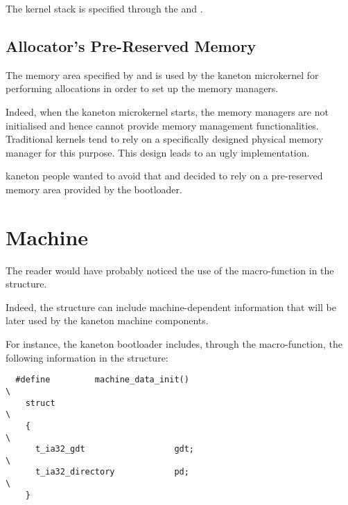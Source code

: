 The kernel stack is specified through the  and
.


\subsection*{Allocator's Pre-Reserved Memory}

The memory area specified by  and  is used
by the kaneton microkernel for performing allocations in order to set up
the memory managers.

Indeed, when the kaneton microkernel starts, the memory managers are
not initialised and hence cannot provide memory management functionalities.
Traditional kernels tend to rely on a specifically designed physical memory
manager for this purpose. This design leads to an ugly implementation.

kaneton people wanted to avoid that and decided to rely on a pre-reserved
memory area provided by the bootloader.

%
%

\section{Machine}

The reader would have probably noticed the use of the 
macro-function in the  structure.

Indeed, the  structure can include machine-dependent information
that will be later used by the kaneton machine components.

For instance, the  kaneton bootloader
includes, through the  macro-function, the following
information in the  structure:

\begin{verbatim}
  #define         machine_data_init()                                     \
    struct                                                                \
    {                                                                     \
      t_ia32_gdt                  gdt;                                    \
      t_ia32_directory            pd;                                     \
    }
\end{verbatim}

